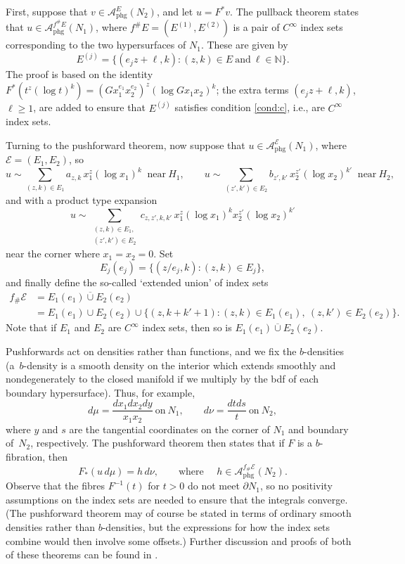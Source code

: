 \documentclass[11pt]{article}
\newcommand{\ie}{i.e.,\xspace}
\theoremstyle{plain}
\theoremstyle{definition}
\theoremstyle{remark}
\def\A{\mathcal{A}}
\newcommand{\calE}{\mathcal E}
\begin{document}
First, suppose that $v \in \A_{\mathrm{phg}}^E(N_2)$, and let $u = F^* v$. The pullback theorem states that $u \in \A_{\mathrm{phg}}^{f^{\#}E}(N_1)$, where $f^{\#}E = (E^{(1)}, E^{(2)})$ is a pair of $C^\infty$ index sets corresponding to the two hypersurfaces of $N_1$. These are given by
\[
E^{(j)} = \{ (e_j z + \ell, k): (z,k) \in E\ \mbox{and}\ \ell \in \mathbb N \}.
\]
The proof is based on the identity $F^* (t^z (\log t)^k) = (G x_1^{e_1} x_2^{e_2})^z (\log G x_1 x_2)^k$; the extra terms $(e_j z + \ell, k)$, $\ell \geq 1$, are added to ensure that $E^{(j)}$ satisfies condition \eqref{cond:c}, \ie are $C^\infty$ index sets.

Turning to the pushforward theorem, now suppose that $u \in \A_{\mathrm{phg}}^\calE(N_1)$, where $\calE = (E_1, E_2)$, so
\[
u \sim \sum_{(z,k) \in E_1} a_{z,k} \, x_1^z (\log x_1)^k\;\; \mbox{near}\ H_1, \qquad
u \sim \sum_{(z',k') \in E_2} b_{z',k'} \, x_2^{z'} (\log x_2)^{k'}\;\; \mbox{near}\ H_2,
\]
and with a product type expansion
\begin{equation}
u \sim \sum_{\substack{(z,k) \in E_1,\\ (z', k') \in E_2}} c_{z,z', k, k'}\, x_1^z (\log x_1)^k x_2^{z'} (\log x_2)^{k'}
\label{prodexp}
\end{equation}
near the corner where $x_1 = x_2 = 0$. Set
\[
E_j(e_j) = \{(z/e_j, k): (z,k) \in E_j\},
\]
and finally define the so-called `extended union' of index sets
\begin{align*}
f_{\#} \calE &= E_1(e_1) \overline{\cup} E_2(e_2) \\
&= E_1(e_1) \cup E_2(e_2) \cup \{ (z,k+k'+1): (z,k) \in E_1(e_1),\ (z, k') \in E_2(e_2) \}.
\end{align*}
Note that if $E_1$ and $E_2$ are $C^\infty$ index sets, then so is
$E_1(e_1) \overline{\cup} E_2(e_2)$.

Pushforwards act on densities rather than functions, and we fix the $b$-densities (a~$b$\nobreakdash-density is a smooth density on the interior which extends smoothly
and nondegenerately to the closed manifold if we multiply by the bdf of each boundary hypersurface). Thus, for example,
\[
d\mu = \frac{dx_1 dx_2 dy}{x_1 x_2}\ \mbox{on}\ N_1, \qquad d\nu = \frac{dt ds}{t}\ \mbox{on}\ N_2,
\]
where $y$ and $s$ are the tangential coordinates on the corner of $N_1$ and boundary of~$N_2$, respectively.
The pushforward theorem then states that if $F$ is a $b$-fibration, then
\[
F_*(u\, d\mu) = h \, d\nu, \qquad \text{where }\quad h \in \A^{f_{\#}\calE}_{\mathrm{phg}}(N_2).
\]
Observe that the fibres $F^{-1}(t)$ for $t > 0$ do not meet $\partial N_1$, so no positivity assumptions on the index sets are needed to ensure
that the integrals converge.
(The pushforward theorem may of course be stated in terms of ordinary smooth densities rather than $b$-densities, but the expressions for how
the index sets combine would then involve some offsets.) Further discussion and proofs of both of these theorems can be found in \cite{Melrose1992}.
\end{document}
